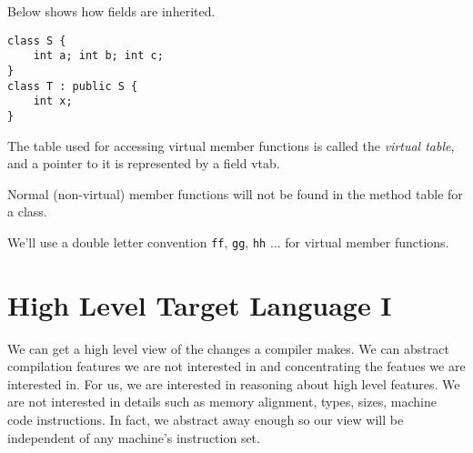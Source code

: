 Below shows how fields are inherited.

\begin{lstlisting}
class S {
	int a; int b; int c;
}
class T : public S {
	int x;
}
\end{lstlisting}


\begin{figure}[h]
\end{figure} 





The table used for accessing virtual member functions is called 
the \textit{virtual table}, and a pointer to it is represented by a 
field vtab. 


Normal (non-virtual) member functions will not be found in the method table 
for a class. 

We'll use a double letter convention 
\lstinline{ff}, \lstinline{gg}, \lstinline{hh} ... for virtual member functions.





\section{High Level Target Language I}

We can get a high level view of the changes a compiler makes.
We can abstract compilation features we are not interested in
and concentrating the featues we are interested in. 
For us, we are interested in reasoning about high level features. 
We are not interested in details such as 
memory alignment, types, sizes, machine code instructions.
In fact, we abstract away enough so our view will be independent of 
any machine's instruction set.

